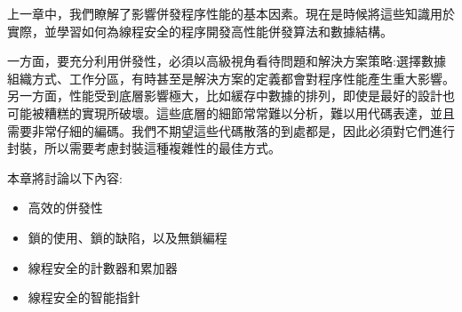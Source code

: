 上一章中，我們瞭解了影響併發程序性能的基本因素。現在是時候將這些知識用於實際，並學習如何為線程安全的程序開發高性能併發算法和數據結構。

一方面，要充分利用併發性，必須以高級視角看待問題和解決方案策略:選擇數據組織方式、工作分區，有時甚至是解決方案的定義都會對程序性能產生重大影響。另一方面，性能受到底層影響極大，比如緩存中數據的排列，即使是最好的設計也可能被糟糕的實現所破壞。這些底層的細節常常難以分析，難以用代碼表達，並且需要非常仔細的編碼。我們不期望這些代碼散落的到處都是，因此必須對它們進行封裝，所以需要考慮封裝這種複雜性的最佳方式。

本章將討論以下內容:

\begin{itemize}
\item 高效的併發性
\item 鎖的使用、鎖的缺陷，以及無鎖編程
\item 線程安全的計數器和累加器
\item 線程安全的智能指針
\end{itemize}






